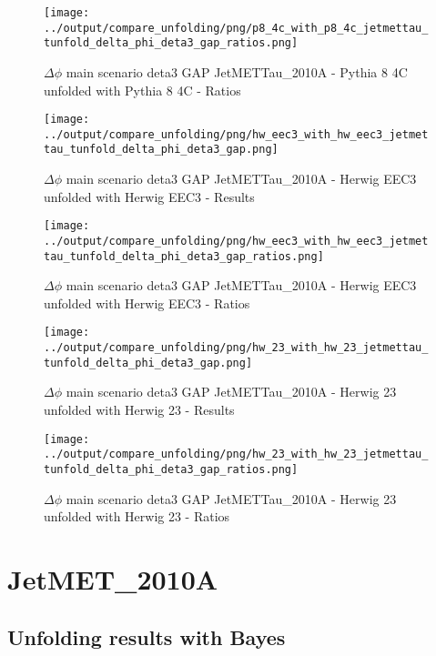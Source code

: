 \documentclass[11pt]{book}
\begin{document}
\begin{figure}[ht]
\centering
\texttt{[image: ../output/compare\_unfolding/png/p8\_4c\_with\_p8\_4c\_jetmettau\_tunfold\_delta\_phi\_deta3\_gap\_ratios.png]}
\caption{$\Delta\phi$ main scenario deta3 GAP JetMETTau\_2010A - Pythia 8 4C unfolded with Pythia 8 4C - Ratios}
\label{p8_p8_jetmettau_tunfold_delta_phi_deta3_gap_b}
\end{figure}

\begin{figure}[ht]
\centering
\texttt{[image: ../output/compare\_unfolding/png/hw\_eec3\_with\_hw\_eec3\_jetmettau\_tunfold\_delta\_phi\_deta3\_gap.png]}
\caption{$\Delta\phi$ main scenario deta3 GAP JetMETTau\_2010A - Herwig EEC3 unfolded with Herwig EEC3 - Results}
\label{hw_eec3_hw_eec3_jetmettau_tunfold_delta_phi_deta3_gap_a}
\end{figure}

\begin{figure}[ht]
\centering
\texttt{[image: ../output/compare\_unfolding/png/hw\_eec3\_with\_hw\_eec3\_jetmettau\_tunfold\_delta\_phi\_deta3\_gap\_ratios.png]}
\caption{$\Delta\phi$ main scenario deta3 GAP JetMETTau\_2010A - Herwig EEC3 unfolded with Herwig EEC3 - Ratios}
\label{hw_eec3_hw_eec3_jetmettau_tunfold_delta_phi_deta3_gap_b}
\end{figure}

\begin{figure}[ht]
\centering
\texttt{[image: ../output/compare\_unfolding/png/hw\_23\_with\_hw\_23\_jetmettau\_tunfold\_delta\_phi\_deta3\_gap.png]}
\caption{$\Delta\phi$ main scenario deta3 GAP JetMETTau\_2010A - Herwig 23 unfolded with Herwig 23 - Results}
\label{hw_23_hw_23_jetmettau_tunfold_delta_phi_deta3_gap_a}
\end{figure}

\begin{figure}[ht]
\centering
\texttt{[image: ../output/compare\_unfolding/png/hw\_23\_with\_hw\_23\_jetmettau\_tunfold\_delta\_phi\_deta3\_gap\_ratios.png]}
\caption{$\Delta\phi$ main scenario deta3 GAP JetMETTau\_2010A - Herwig 23 unfolded with Herwig 23 - Ratios}
\label{hw_23_hw_23_jetmettau_tunfold_delta_phi_deta3_gap_b}
\end{figure}


\section{JetMET\_2010A}
\subsection{Unfolding results with Bayes}
\end{document}
